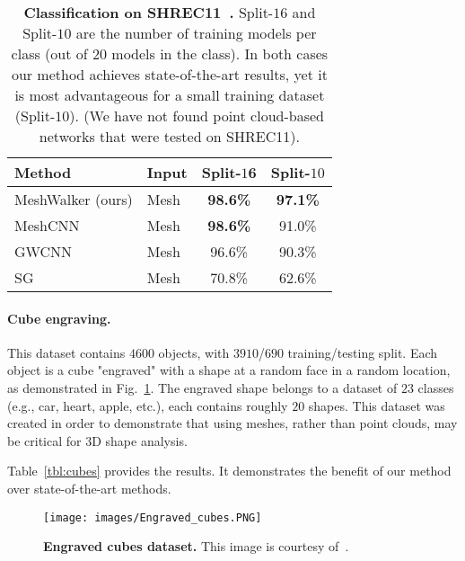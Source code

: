 \documentclass[acmtog]{acmart}
\begin{document}
\begin{table}[htb]\caption{{\bf Classification on SHREC11~\cite{lian2011shape}.}
 Split-$16$ and Split-$10$ are the number of training models per class (out of $20$ models in the class).
 In both cases our method achieves state-of-the-art results, yet it is most advantageous for a small training dataset (Split-$10$).
 (We have not found point cloud-based networks that were tested on SHREC11).
 }
\begin{center}
 \begin{tabular}
 {||l l c c||} 
 \hline
 Method & Input & Split-$1$6  & Split-$10$\\ [0.5ex] 
 \hline\hline\hline
 MeshWalker (ours) & Mesh & \textbf{98.6\%} & \textbf{97.1\%} \\ 
 \hline
 MeshCNN~\cite{hanocka2019meshcnn} & Mesh & \textbf{98.6\%} & 91.0\% \\
 \hline
 GWCNN~\cite{ezuz2017gwcnn} & Mesh & 96.6\% & 90.3\% \\
 \hline
 SG~\cite{bronstein2011shape} & Mesh & 70.8\% & 62.6\% \\
 \hline
 \hline
\end{tabular}
\label{tbl:shrec11}
\end{center}
\end{table}

\paragraph{Cube engraving.}
This dataset contains $4600$ objects, with $3910$/$690$ training/testing split.
Each object is a cube "engraved" with a shape at a random face in a random location, as demonstrated in Fig.~\ref{fig:cube}.
The engraved shape belongs to a dataset of $23$ classes (e.g., car, heart, apple, etc.), each contains roughly $20$ shapes. 
This dataset was created in order to demonstrate that using meshes, rather than point clouds, may be critical for 3D shape analysis.

Table~\ref{tbl:cubes} provides the results.
It demonstrates the benefit of our method over state-of-the-art methods.

\begin{figure}[htb] 
\centering 
\texttt{[image: images/Engraved\_cubes.PNG]}
\caption{{\bf Engraved cubes dataset.} 
This image is courtesy of~\cite{hanocka2019meshcnn}.
}
\label{fig:cube} 
\end{figure}
\end{document}
